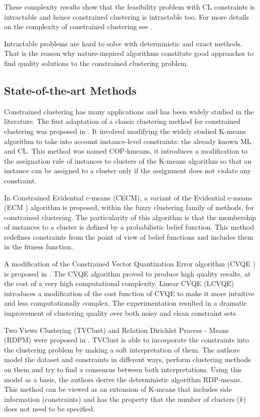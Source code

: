 \documentclass[review]{elsarticle}
\begin{document}
These complexity results show that the feasibility problem with CL constraints is intractable and hence constrained clustering is intractable too. For more details on the complexity of constrained clustering see \cite{davidson2005clustering}.

Intractable problems are hard to solve with deterministic and exact methods. That is the reason why nature-inspired algorithms constitute good approaches to find quality solutions to the constrained clustering problem.

\subsection{State-of-the-art Methods} \label{sec:BackSOTA}

Constrained clustering has many applications and has been widely studied in the literature. The first adaptation of a classic clustering method for constrained clustering was proposed in \cite{wagstaff2001constrained}. It involved modifying the widely studied K-means algorithm to take into account instance-level constraints: the already known ML and CL. This method was named COP-kmeans, it introduces a modification to the assignation rule of instances to clusters of the K-means algorithm so that an instance can be assigned to a cluster only if the assignment does not violate any constraint.

In \cite{antoine2012cecm} Constrained Evidential c-means (CECM), a variant of the Evidential c-means (ECM \cite{masson2008ecm}) algorithm is proposed, within the fuzzy clustering family of methods, for constrained clustering. The particularity of this algorithm is that the membership of instances to a cluster is defined by a probabilistic belief function. This method redefines constraints from the point of view of belief functions and includes them in the fitness function.

A modification of the Constrained Vector Quantization Error algorithm (CVQE \cite{davidson2005clustering}) is proposed in \cite{pelleg2007k}. The CVQE algorithm proved to produce high quality results, at the cost of a very high computational complexity. Linear CVQE (LCVQE) introduces a modification of the cost function of CVQE to make it more intuitive and less computationally complex. The experimentation resulted in a dramatic improvement of clustering quality over both noisy and clean constraint sets.

Two Views Clustering (TVClust) and Relation Dirichlet Process - Means (RDPM) were proposed in \cite{khashabi2015clustering}. TVClust is able to incorporate the constraints into the clustering problem by making a soft interpretation of them. The authors model the dataset and constraints in different ways, perform clustering methods on them and try to find a consensus between both interpretations. Using this model as a basis, the authors derive the deterministic algorithm RDP-means. This method can be viewed as an extension of K-means that includes side information (constraints) and has the property that the number of clusters ($k$) does not need to be specified.
\end{document}
